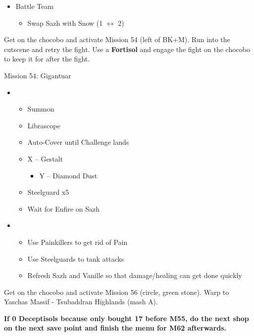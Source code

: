\begin{menu}
	\begin{itemize}
	\paradigm
		\begin{itemize}
			\item Battle Team
				\begin{itemize}
					\item Swap Sazh with Snow (1 $\leftrightarrow$ 2)
				\end{itemize}
		\end{itemize}
	\end{itemize}
\end{menu}

Get on the chocobo and activate Mission 54 (left of BK+M).
Run into the cutscene and retry the fight.
Use a \textbf{Fortisol} and engage the fight on the chocobo to keep it for after the fight.

\begin{battle}{Mission 54: Gigantuar}
	\begin{itemize}
		\item \fourth
			\begin{itemize}
				\item Summon
				\item Librascope
				\item Auto-Cover until Challenge lands
				\item X -- Gestalt
					\begin{itemize}
						\item Y -- Diamond Dust
					\end{itemize}
				\item Steelguard x5
				\item Wait for Enfire on Sazh
			\end{itemize}
		\item \third
			\begin{itemize}
				\item Use Painkillers to get rid of Pain
				\item Use Steelguards to tank attacks
				\item Refresh Sazh and Vanille so that damage/healing can get done quickly
			\end{itemize}
	\end{itemize}
\end{battle}

Get on the chocobo and activate Mission 56 (circle, green stone).
Warp to Yaschas Massif - Tsubaddran Highlands (mash A).

\textbf{If 0 Deceptisols because only bought 17 before M55, do the next shop on the next save point and finish the menu for M62 afterwards.}

